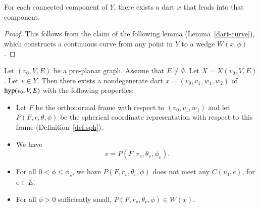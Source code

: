 \begin{lemma}
For each connected component of 
$Y$, there exists a
dart $x$ that leads into that component.
\end{lemma}

\begin{proof} This follows from the claim
of the following lemma (Lemma~\ref{dart-curve}), 
which constructs
a continuous curve from any point in 
$Y$ to a wedge
$W(x,\phi)$.
\end{proof}

\begin{lemma}\label{lemma:dart-curve}
Let $(v_0,V,E)$ be a pre-planar graph.  Assume that $E\ne\emptyset$.
Let $X=X(v_0,V,E)$.
Let $v\in Y$.  
Then there exists a nondegenerate dart 
$x=(v_0,v_1,w_1,w_2)$ of ${\operatorname{hyp}}(v_0,V,E)$ with the
following properties:
\begin{itemize}
\item Let $F$ be the orthonormal frame with respect to 
  $(v_0,v_1,w_1)$ and let $P(F,r,\theta,\phi)$ be the spherical
  coordinate representation with respect to this frame
  (Definition~\ref{def:sph}).
\item We have
   $$v = P(F,r_v,\theta_v,\phi_v).$$
\item 
   For all $0 < \phi \le \phi_v$, we have
   $P(F,r_v,\theta_v,\phi)$ does not meet any $C(v_0,e)$, 
   for $e\in E$.
\item For all $\phi>0$ sufficiently small,
   $P(F,r_v,\theta_v,\phi)\in W(x)$.
\end{itemize}
\end{lemma}

